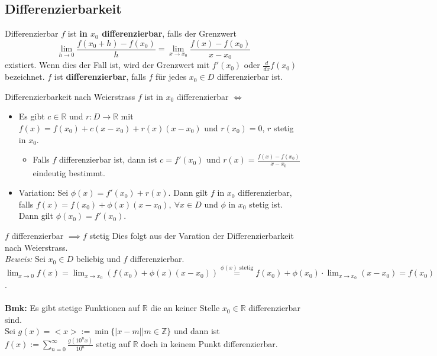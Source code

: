 \documentclass[a4paper,fontsize = 7pt]{scrartcl}
\def\limxo{\lim_{x\to 0}}
\def\sumn{\sum_{n=0}^\infty}
\def\Z{\mathbb{Z}}
\def\R{\mathbb{R}}
\begin{document}
\subsection{Differenzierbarkeit}
\begin{mainbox}{Differenzierbar}
  \vspace{-4pt}
 $f$ ist \textbf{in $x_0$ differenzierbar}, falls der Grenzwert $$\lim_{h \to 0} \frac{f(x_0 + h) - f(x_0)}{h} = \lim_{x\to x_0} \frac{f(x) - f(x_0)}{x - x_0}$$ existiert. Wenn dies der Fall ist, wird der Grenzwert mit $f'(x_0)$ oder $\frac{d}{dx}f(x_0)$ bezeichnet. $f$ ist \textbf{differenzierbar}, falls $f$ für jedes $x_0 \in D$ differenzierbar ist.
 \vspace{-4pt}
\end{mainbox}
\begin{subbox}{Differenzierbarkeit nach Weierstrass}
  \vspace{-4pt}
  $f$ ist in $x_0$ differenzierbar $\iff$ 
 \begin{itemize}
  \item Es gibt $c \in \R$ und $r: D \to \R$ mit $f(x) = f(x_0) + c(x - x_0) + r(x) (x - x_0)$ und $r(x_0) = 0$, $r$ stetig in $x_0$. 
  \begin{itemize}
  \item Falls $f$ differenzierbar ist, dann ist $c = f'(x_0)$ und $r(x) = \frac{f(x) - f(x_0)}{x - x_0}$ eindeutig bestimmt.
  \end{itemize}
  \item Variation: Sei $\phi(x) = f'(x_0) + r(x)$. Dann gilt $f$ in $x_0$ differenzierbar, falls $f(x) = f(x_0) + \phi(x) (x-x_0), \ \forall x \in D$ und $\phi$ in $x_0$ stetig ist.
  Dann gilt $\phi(x_0) = f'(x_0)$.
  
 \end{itemize} 
 \vspace{-4pt}
\end{subbox}

\begin{subbox}{$f$ differenzierbar $\implies f$ stetig}
  \vspace{-4pt}
  Dies folgt aus der Varation der Differenzierbarkeit nach Weierstrass.
  \\\textit{Beweis:} Sei $x_0 \in D$ beliebig und $f$ differenzierbar.
  $\limxo f(x) = \lim_{x \to x_0} (f(x_0) + \phi(x)(x - x_0)) \overset{\phi(x) \text{ stetig}}{=} f(x_0) + \phi(x_0) \cdot \lim_{x \to x_0}(x - x_0) = f(x_0)$.
  \\ \\\textbf{Bmk:} Es gibt stetige Funktionen auf $\R$ die an keiner Stelle $x_0 \in \R$ differenzierbar sind.
  \\ Sei $g(x) = <x> := \min \{|x-m|\vert m \in \Z\}$ und dann ist $f(x) := \sumn \frac{g(10^nx)}{10^n}$ stetig auf $\R$ doch in keinem Punkt differenzierbar.
  \vspace{-4pt}
\end{subbox}
\end{document}
